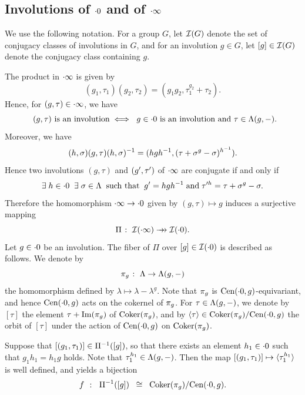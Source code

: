 \documentclass{amsart} %
\begin{document}
\subsection{Involutions of $\cdot 0$ and of $\cdot \infty$}\label{subsec:zinf}
%
We use the following notation.
For a group $G$, let $\mathord{\mathcal{I}}(G)$ denote the set of conjugacy classes of involutions in $G$, and 
for an involution $g\in G$, let $[g]\in \mathord{\mathcal{I}}(G)$ denote the conjugacy class containing $g$.
\par
The product in $\cdot \infty$ is given by 
\[
(g_1, \tau_1)(g_2, \tau_2)=(g_1g_2, \tau_1^{g_2}+\tau_2).
\]
Hence, for $(g, \tau)\in \cdot \infty$, we have 
%
\begin{equation}\label{eq:gtauisinvoliff}
\textrm{\;\;$(g, \tau)$ is an involution}
\;\Longleftrightarrow\;
\textrm{
$g\in \cdot 0$ is an involution and $\tau\in \Lambda(g, -)$}.
\end{equation}
%
Moreover, we have 
%
\begin{equation}\label{eq:hsgthsinv}
(h, \sigma)(g, \tau)(h, \sigma)^{-1}
=(hgh^{-1}, (\tau+\sigma^g-\sigma)^{h^{-1}}).
\end{equation}
%
Hence 
two involutions $(g, \tau)$ and $(g^{\prime}, \tau^{\prime})$ of $\cdot \infty$ are conjugate if and only if
%
\begin{equation}\label{eq:conjiff}
\exists\; h\in \cdot 0 \;\;
\exists\; \sigma\in \Lambda \;\;
\textrm{such that} \;\;
g^{\prime}=h g h^{-1}
\;\textrm{and}\; \tau\sp{\prime h}=\tau+\sigma^{g}-\sigma.
\end{equation}
%
Therefore the homomorphism $\cdot \infty \to \cdot 0$ given by $(g, \tau)\mapsto g$
induces a surjective mapping
\[
\Pi\;\colon\; \mathord{\mathcal{I}}(\cdot \infty)\mathrel{\rightarrow\!\!\!\!\rightarrow} \mathord{\mathcal{I}}(\cdot 0).
\]
Let $g\in \cdot 0$ be an involution.
The fiber of $\Pi$ over $[g]\in\mathord{\mathcal{I}}(\cdot 0)$ is described as follows.
We denote by 
\[
\pi_{g}\;\colon\; \Lambda \to \Lambda (g, -)
\]
the homomorphism defined by $\lambda\mapsto \lambda-\lambda^g$.
Note that $\pi_{g}$ is $\mathrm{Cen}(\cdot 0, g)$-equivariant,
and hence $\mathrm{Cen}(\cdot 0, g)$ acts on the cokernel of $\pi_{g}$.
For $\tau\in \Lambda (g, -)$, 
we denote by $[\tau]$ the element $\tau+\operatorname{Im}(\pi_{g})$ of $\operatorname{Coker}(\pi_{g})$,
and by $\langle {\tau} \rangle\in \operatorname{Coker}(\pi_{g})/\mathrm{Cen}(\cdot 0, g)$ the orbit of
$[\tau]$ under the action of $\mathrm{Cen}(\cdot 0, g)$ on $ \operatorname{Coker}(\pi_{g})$.
%
%
\begin{proposition}\label{prop:bijf}
Suppose that $[(g_1, \tau_1)]\in \Pi^{-1}([g])$,
so that there exists an element $h_1\in \cdot 0$
such that $g_1h_1=h_1 g $ holds.
Note that $\tau_1\sp{h_1}\in \Lambda(g, -)$.
Then the map
$[(g_1, \tau_1)] \mapsto \langle {\tau_1\sp{h_1}} \rangle$ 
is well defined, and 
yields a bijection 
%
\begin{equation}\label{eq:Piinvg}
f\;\;\colon\;\; \Pi^{-1}([g])\;\;\cong\;\; \operatorname{Coker}(\pi_{g})/\mathrm{Cen}(\cdot 0, g).
\end{equation}
%
\end{proposition}
\end{document}
